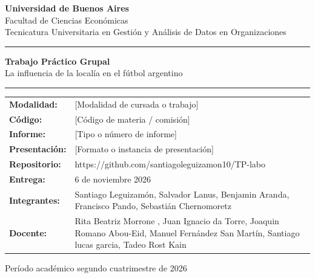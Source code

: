 \documentclass[12pt,a4paper]{article}
\newcommand{\institucion}{Universidad de Buenos Aires}
\newcommand{\facultad}{Facultad de Ciencias Económicas}
\newcommand{\carrera}{Tecnicatura Universitaria en Gestión y Análisis de Datos en Organizaciones}
\newcommand{\tituloTrabajo}{Trabajo Práctico Grupal}
\newcommand{\subtituloTrabajo}{La influencia de la localía en el fútbol argentino}
\begin{document}
\thispagestyle{empty}
\begin{center}
    {\large\bfseries \institucion}\\[0.25em]
    {\large \facultad}\\[0.25em]
    {\normalsize \carrera}
\end{center}

\vspace{1.4cm}
\noindent\rule{\textwidth}{0.7pt}

\vspace{1.5cm}
\begin{center}
    {\LARGE\bfseries \tituloTrabajo}\\[0.8em]
    {\large \subtituloTrabajo}
\end{center}

\vspace{1.4cm}
\noindent\rule{\textwidth}{0.4pt}
\vspace{0.5em}

\renewcommand{\arraystretch}{1.45}
\noindent\begin{tabular}{@{}>{\bfseries}p{}p{}@{}}
Modalidad: & [Modalidad de cursada o trabajo] \\
Código: & [Código de materia / comisión] \\
Informe: & [Tipo o número de informe] \\
Presentación: & [Formato o instancia de presentación] \\
Repositorio: & https://github.com/santiagoleguizamon10/TP-labo \\
Entrega: & 6 de noviembre 2026 \\
Integrantes: & Santiago Leguizamón, Salvador Lanus, Benjamin Aranda, Francisco Pando,
Sebastián Chernomoretz \\
Docente: &  Rita Beatriz Morrone , Juan Ignacio da Torre, Joaquin Romano Abou-Eid, Manuel Fernández San Martín, Santiago lucas garcia, Tadeo Rost Kain
 \\
\end{tabular}

\vfill
\begin{center}
    {\large Período académico segundo cuatrimestre de 2026}
\end{center}
\clearpage

\end{document}
